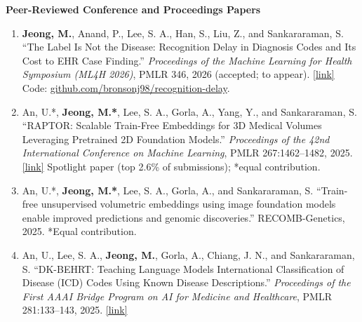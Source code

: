 \documentclass[10pt,letterpaper]{article}
\begin{document}
\textbf{Peer-Reviewed Conference and Proceedings Papers}
\begin{enumerate}[resume]
\item \textbf{Jeong, M.}, Anand, P., Lee, S. A., Han, S., Liu, Z., and Sankararaman, S. ``The Label Is Not the Disease: Recognition Delay in Diagnosis Codes and Its Cost to EHR Case Finding.'' \emph{Proceedings of the Machine Learning for Health Symposium (ML4H 2026)}, PMLR 346, 2026 (accepted; to appear). \href{https://openreview.net/forum?id=icuB1d7to4}{[link]} Code: \href{https://github.com/bronsonj98/recognition-delay}{github.com/\allowbreak bronsonj98/\allowbreak recognition-delay}.
\item An, U.*, \textbf{Jeong, M.*}, Lee, S. A., Gorla, A., Yang, Y., and Sankararaman, S. ``RAPTOR: Scalable Train-Free Embeddings for 3D Medical Volumes Leveraging Pretrained 2D Foundation Models.'' \emph{Proceedings of the 42nd International Conference on Machine Learning}, PMLR 267:1462--1482, 2025. \href{https://proceedings.mlr.press/v267/an25a.html}{[link]} Spotlight paper (top 2.6\% of submissions); *equal contribution.
\item An, U.*, \textbf{Jeong, M.*}, Lee, S. A., Gorla, A., and Sankararaman, S. ``Train-free unsupervised volumetric embeddings using image foundation models enable improved predictions and genomic discoveries.'' RECOMB-Genetics, 2025. *Equal contribution.
\item An, U., Lee, S. A., \textbf{Jeong, M.}, Gorla, A., Chiang, J. N., and Sankararaman, S. ``DK-BEHRT: Teaching Language Models International Classification of Disease (ICD) Codes Using Known Disease Descriptions.'' \emph{Proceedings of the First AAAI Bridge Program on AI for Medicine and Healthcare}, PMLR 281:133--143, 2025. \href{https://proceedings.mlr.press/v281/an25a.html}{[link]}
\end{enumerate}
\end{document}
